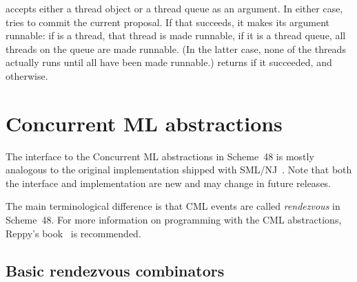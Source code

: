  accepts either a thread object or a
thread queue as an argument.  In either case,
 tries to commit the current
proposal.  If that succeeds, it 
makes its argument runnable: if  is a thread,
that thread is made runnable, if it is a thread queue, all threads on
the queue are made runnable.  (In the latter case, none of the threads
actually runs until all have been made runnable.)
 returns  if it succeeded,
and  otherwise.


\section{Concurrent ML abstractions}

The interface to the Concurrent ML abstractions in Scheme~48 is
mostly analogous to the original implementation shipped with
SML/NJ~\cite{Reppy:CML-book}.  Note that both the interface and
implementation are new and may change in future releases.

The main terminological difference is that CML events are called
\textit{rendezvous} in Scheme~48.  For more information on programming
with the CML abstractions, Reppy's book~\cite{Reppy:CML-book} is
recommended.

\subsection{Basic rendezvous combinators}

